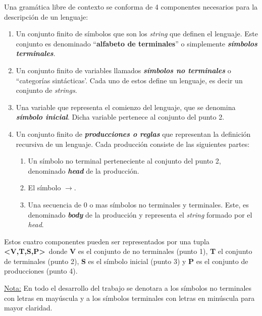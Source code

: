 \begin{definition}
Una gramática libre de contexto se conforma de 4 componentes necesarios para la descripción de un lenguaje:

\begin{enumerate}
\item Un conjunto finito de símbolos que son los \textit{string} que definen el lenguaje. Este conjunto es denominado ``\textbf{alfabeto de terminales}'' o simplemente \textit{\textbf{símbolos terminales}}.

\item Un conjunto finito de variables llamados \textit{\textbf{símbolos no terminales}} o ``categorías sintácticas'. Cada uno de estos define un lenguaje, es decir un conjunto de \textit{strings}.

\item Una variable que representa el comienzo del lenguaje, que se denomina \textit{\textbf{símbolo inicial}}. Dicha variable pertenece al conjunto del punto 2.

\item Un conjunto finito de \textit{\textbf{producciones o reglas}} que representan la definición recursiva de un lenguaje. Cada producción consiste de las siguientes partes:

\begin{enumerate}
\item Un símbolo no terminal perteneciente al conjunto del punto 2, denominado \textit{\textbf{head}} de la producción.

\item El símbolo \textbf{$\rightarrow$}.

\item Una secuencia de $0$ o mas símbolos no terminales y terminales. Este, es denominado \textit{\textbf{body}} de la producción y representa el \textit{string} formado por el \textit{head}.
\end{enumerate}
\end{enumerate}

Estos cuatro componentes pueden ser representados por una tupla \textbf{<V,T,S,P>}\ donde \textbf{V} es el conjunto de no terminales (punto 1), \textbf{T} el conjunto de terminales (punto 2), \textbf{S} es el símbolo inicial (punto 3) y \textbf{P} es el conjunto de producciones (punto 4).
\end{definition}

\underline{Nota:}
En todo el desarrollo del trabajo se denotara a los símbolos no terminales con letras en mayúscula y a los símbolos terminales con letras en minúscula para mayor claridad.

